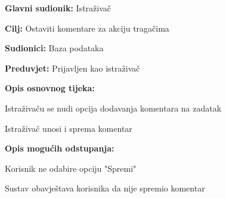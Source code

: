 					\noindent {}
					\begin{packed_item}
						
						\item \textbf{Glavni sudionik:} Istraživač
						\item  \textbf{Cilj:} Ostaviti komentare za akciju tragačima 
						\item  \textbf{Sudionici:} Baza podataka
						\item  \textbf{Preduvjet:} Prijavljen kao istraživač
						\item  \textbf{Opis osnovnog tijeka:}
						
						\item[] \begin{packed_enum}
							
							\item Istraživaču se nudi opcija dodavanja komentara na zadatak
							\item Istraživač unosi i sprema komentar
							
						\end{packed_enum}
						
						\item  \textbf{Opis mogućih odstupanja:}
						
						\item[] \begin{packed_item}
							
							\item[4.a]Korisnik ne odabire opciju "Spremi"
						\item[] \begin{packed_enum}
							
							\item Sustav obavještava korisnika da nije spremio komentar
							
						\end{packed_enum}
							
						\end{packed_item}
						
					\end{packed_item}
					
